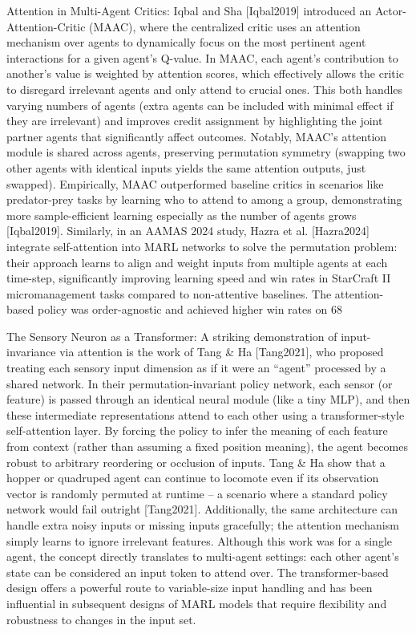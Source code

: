 \documentclass{article}
\begin{document}
Attention in Multi-Agent Critics: Iqbal and Sha [Iqbal2019] introduced an Actor-Attention-Critic (MAAC), where the centralized critic uses an attention mechanism over agents to dynamically focus on the most pertinent agent interactions for a given agent’s Q-value. In MAAC, each agent’s contribution to another’s value is weighted by attention scores, which effectively allows the critic to disregard irrelevant agents and only attend to crucial ones. This both handles varying numbers of agents (extra agents can be included with minimal effect if they are irrelevant) and improves credit assignment by highlighting the joint partner agents that significantly affect outcomes. Notably, MAAC’s attention module is shared across agents, preserving permutation symmetry (swapping two other agents with identical inputs yields the same attention outputs, just swapped). Empirically, MAAC outperformed baseline critics in scenarios like predator-prey tasks by learning who to attend to among a group, demonstrating more sample-efficient learning especially as the number of agents grows [Iqbal2019]. Similarly, in an AAMAS 2024 study, Hazra et al. [Hazra2024] integrate self-attention into MARL networks to solve the permutation problem: their approach learns to align and weight inputs from multiple agents at each time-step, significantly improving learning speed and win rates in StarCraft II micromanagement tasks compared to non-attentive baselines. The attention-based policy was order-agnostic and achieved higher win rates on 68%

The Sensory Neuron as a Transformer: A striking demonstration of input-invariance via attention is the work of Tang \& Ha [Tang2021], who proposed treating each sensory input dimension as if it were an “agent” processed by a shared network. In their permutation-invariant policy network, each sensor (or feature) is passed through an identical neural module (like a tiny MLP), and then these intermediate representations attend to each other using a transformer-style self-attention layer. By forcing the policy to infer the meaning of each feature from context (rather than assuming a fixed position meaning), the agent becomes robust to arbitrary reordering or occlusion of inputs. Tang \& Ha show that a hopper or quadruped agent can continue to locomote even if its observation vector is randomly permuted at runtime – a scenario where a standard policy network would fail outright [Tang2021]. Additionally, the same architecture can handle extra noisy inputs or missing inputs gracefully; the attention mechanism simply learns to ignore irrelevant features. Although this work was for a single agent, the concept directly translates to multi-agent settings: each other agent’s state can be considered an input token to attend over. The transformer-based design offers a powerful route to variable-size input handling and has been influential in subsequent designs of MARL models that require flexibility and robustness to changes in the input set.
\end{document}
